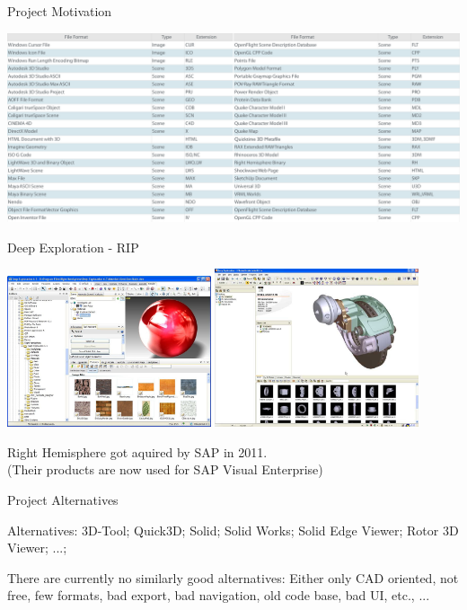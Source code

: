 \begin{frame}{Project Motivation}

	\center
	\includegraphics[width=\textwidth]{intro/fileformats}

\end{frame}


\begin{frame}{Deep Exploration - RIP}
	
	\center
	
	\includegraphics[width=0.45\textwidth]{intro/deepexp_01}
	\quad
	\includegraphics[width=0.45\textwidth]{intro/deepexp_02}
	\bigskip
	
	Right Hemisphere got aquired by SAP in 2011.\\\scriptsize\medskip
	(Their products are now used for SAP Visual Enterprise)

\end{frame}


\begin{frame}{Project Alternatives}
	
	\Large
	Alternatives: 3D-Tool; Quick3D; Solid; Solid Works; Solid Edge Viewer; Rotor 3D Viewer; ...; 
	\bigskip

	\normalsize
	There are currently no similarly good alternatives: Either only CAD oriented, not free, few formats, bad export, bad navigation, old code base, bad UI, etc., ...

\end{frame}


